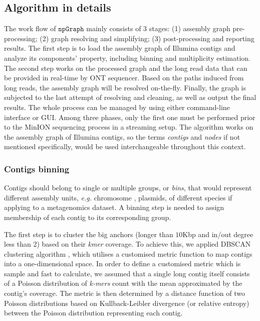 \documentclass[10pt,letterpaper]{article}
\newcommand{\npgraph}{$\mathtt{npGraph}$}
\newcommand{\EG}{\emph{e.g.}}
\begin{document}
\subsection*{Algorithm in details}
The work flow of \npgraph{} mainly consists of 3 stages: (1) assembly graph pre-processing; (2) graph resolving and simplifying; (3) post-processing and reporting results. 
The first step is to load the assembly graph of Illumina contigs and analyze its components' property, including binning and multiplicity estimation.
The second step works on the processed graph and the long read data that can be provided in real-time by ONT sequencer. Based on the paths induced from long reads, the assembly graph will be resolved on-the-fly.
Finally, the graph is subjected to the last attempt of resolving and cleaning, as well as output the final results. The whole process can be managed by using either command-line interface or GUI.
Among three phases, only the first one must be performed prior to the MinION sequencing process in a streaming setup.
The algorithm works on the assembly graph of Illumina contigs, so the terms \emph{contigs} and \emph{nodes} if not mentioned specifically, would be used interchangeable throughout this context.
\subsubsection*{Contigs binning}
Contigs should belong to single or multiple groups, or \emph{bins}, that would represent different assembly units, \EG{} chromosome , plasmids, of different species if applying to a metagenomics dataset. 
A binning step is needed to assign membership of each contig to its corresponding group. 

The first step is to cluster the big anchors (longer than $10$Kbp and in/out degree less than 2) based on their \emph{kmer} coverage.
To achieve this, we applied DBSCAN clustering algorithm \cite{Ester96adensity-based}, which utilises a customised metric function to map contigs into a one-dimensional space.  In order to 
 define a customised metric which is sample and fast to calculate, we assumed that a single long contig itself consists of a Poisson distribution of \emph{k-mers} count with the mean approximated by the contig's coverage. 
The metric is then determined by a distance function of two Poisson distributions based on Kullback-Leibler divergence (or relative entropy) between the Poisson distribution representing each contig\cite{Kullback1951information}.
\end{document}
